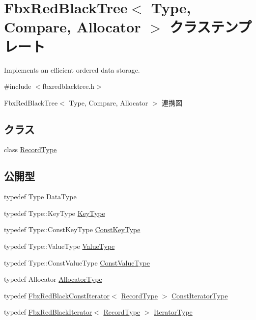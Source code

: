 \hypertarget{class_fbx_red_black_tree}{}\section{Fbx\+Red\+Black\+Tree$<$ Type, Compare, Allocator $>$ クラステンプレート}
\label{class_fbx_red_black_tree}


Implements an efficient ordered data storage.  




{\ttfamily \#include $<$fbxredblacktree.\+h$>$}



Fbx\+Red\+Black\+Tree$<$ Type, Compare, Allocator $>$ 連携図
\subsection*{クラス}
\begin{DoxyCompactItemize}
\item 
class \hyperlink{class_fbx_red_black_tree_1_1_record_type}{Record\+Type}
\end{DoxyCompactItemize}
\subsection*{公開型}
\begin{DoxyCompactItemize}
\item 
typedef Type \hyperlink{class_fbx_red_black_tree_a9bd3feb4c82e7d105bc475f01a9a199d}{Data\+Type}
\item 
typedef Type\+::\+Key\+Type \hyperlink{class_fbx_red_black_tree_a241b31c6972995417d193458b7bb27e2}{Key\+Type}
\item 
typedef Type\+::\+Const\+Key\+Type \hyperlink{class_fbx_red_black_tree_ad0aa82c0fd952b04edb550fc1fb36a32}{Const\+Key\+Type}
\item 
typedef Type\+::\+Value\+Type \hyperlink{class_fbx_red_black_tree_a178e34888fa8c0fab5a7527ab30a663c}{Value\+Type}
\item 
typedef Type\+::\+Const\+Value\+Type \hyperlink{class_fbx_red_black_tree_a60ce913af196ee4cf886585363c4b0ca}{Const\+Value\+Type}
\item 
typedef Allocator \hyperlink{class_fbx_red_black_tree_a62c49ab2e7d602aac98a9413e490ca90}{Allocator\+Type}
\item 
typedef \hyperlink{class_fbx_red_black_const_iterator}{Fbx\+Red\+Black\+Const\+Iterator}$<$ \hyperlink{class_fbx_red_black_tree_1_1_record_type}{Record\+Type} $>$ \hyperlink{class_fbx_red_black_tree_a7309ae5e1bb24e7e3da94fef975d10c4}{Const\+Iterator\+Type}
\item 
typedef \hyperlink{class_fbx_red_black_iterator}{Fbx\+Red\+Black\+Iterator}$<$ \hyperlink{class_fbx_red_black_tree_1_1_record_type}{Record\+Type} $>$ \hyperlink{class_fbx_red_black_tree_af7b6209131012ec5aa33e0286c956cd6}{Iterator\+Type}
\end{DoxyCompactItemize}
